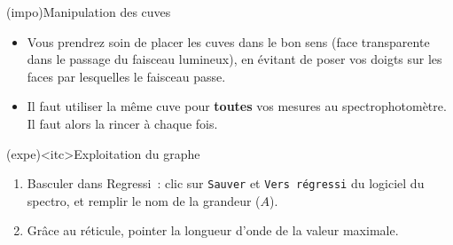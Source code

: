 \documentclass[../main/main.tex]{subfiles}
\begin{document}
{	\begin{tcb}(impo){Manipulation des cuves}
		\begin{itemize}
			\item Vous prendrez soin de placer les cuves dans le bon sens (face transparente
			      dans le passage du faisceau lumineux), en évitant de poser vos doigts sur les
			      faces par lesquelles le faisceau passe.
			\item
			      Il faut utiliser la même cuve pour \textbf{toutes} vos
			      mesures au spectrophotomètre. Il faut alors la rincer à chaque fois.
		\end{itemize}
	\end{tcb}

	\begin{tcb}(expe)<itc>{Exploitation du graphe}
		\begin{enumerate}
			\item Basculer dans Regressi~: clic sur \texttt{Sauver} et \texttt{Vers
				      régressi} du logiciel du spectro, et remplir le nom de la grandeur
			      ($A$).
			\item Grâce au réticule, pointer la longueur d'onde de la valeur maximale.
		\end{enumerate}
	\end{tcb}
}

\resetQ
{}
\end{document}

